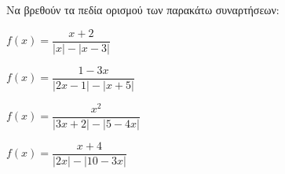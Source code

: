 Να βρεθούν τα πεδία ορισμού των παρακάτω συναρτήσεων:
\begin{alist}
\item $ f(x)=\dfrac{x+2}{|x|-|x-3|} $
\item $ f(x)=\dfrac{1-3x}{|2x-1|-|x+5|} $
\item $ f(x)=\dfrac{x^2}{|3x+2|-|5-4x|} $
\item $ f(x)=\dfrac{x+4}{|2x|-|10-3x|} $
\end{alist}
